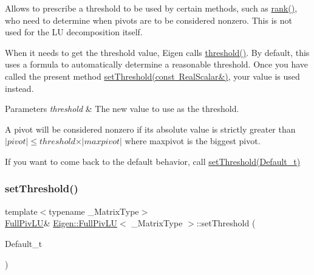 Allows to prescribe a threshold to be used by certain methods, such as \mbox{\hyperlink{class_eigen_1_1_full_piv_l_u_a67a870aa69e699e058d04802ba0bdad9}{rank()}}, who need to determine when pivots are to be considered nonzero. This is not used for the LU decomposition itself.

When it needs to get the threshold value, Eigen calls \mbox{\hyperlink{class_eigen_1_1_full_piv_l_u_ad77539203694f2d85ff7d11616e5a0a5}{threshold()}}. By default, this uses a formula to automatically determine a reasonable threshold. Once you have called the present method \mbox{\hyperlink{class_eigen_1_1_full_piv_l_u_a414592d82de98f5bd075965caf56d681}{set\+Threshold(const Real\+Scalar\&)}}, your value is used instead.


\begin{DoxyParams}{Parameters}
{\em threshold} & The new value to use as the threshold.\\
\hline
\end{DoxyParams}
A pivot will be considered nonzero if its absolute value is strictly greater than $ \vert pivot \vert \leqslant threshold \times \vert maxpivot \vert $ where maxpivot is the biggest pivot.

If you want to come back to the default behavior, call \mbox{\hyperlink{class_eigen_1_1_full_piv_l_u_a1b5e30add3dfb6625da1213d68418f44}{set\+Threshold(\+Default\+\_\+t)}} \mbox{\label{class_eigen_1_1_full_piv_l_u_a1b5e30add3dfb6625da1213d68418f44}} 
\subsubsection{\texorpdfstring{setThreshold()}{setThreshold()}\hspace{0.1cm}{\footnotesize\ttfamily [2/2]}}
{\footnotesize\ttfamily template$<$typename \+\_\+\+Matrix\+Type$>$ \\
\mbox{\hyperlink{class_eigen_1_1_full_piv_l_u}{Full\+Piv\+LU}}\& \mbox{\hyperlink{class_eigen_1_1_full_piv_l_u}{Eigen\+::\+Full\+Piv\+LU}}$<$ \+\_\+\+Matrix\+Type $>$\+::set\+Threshold (\begin{DoxyParamCaption}\item[{Default\+\_\+t}]{ }\end{DoxyParamCaption})\hspace{0.3cm}{\ttfamily [inline]}}

